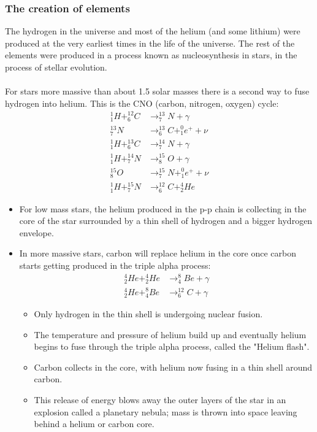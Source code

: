 \documentclass[a4paper,12pt]{article}
\begin{document}
\subsubsection*{The creation of elements}
The hydrogen in the universe and most of the helium (and some lithium) were produced at the very earliest times in the life of the universe. The rest of the elements were produced in a process known as nucleosynthesis in stars, in the process of stellar evolution.\\\\
For stars more massive than about 1.5 solar masses there is a second way to fuse hydrogen into helium. This is the CNO (carbon, nitrogen, oxygen) cycle:
\[\begin{aligned}
^1_1H+^{12}_6C&\rightarrow ^{13}_7N+\gamma\\
^{13}_7N&\rightarrow ^{13}_6C+^0_1e^++\nu\\
^1_1H+^{13}_6C&\rightarrow ^{14}_7N+\gamma\\
^1_1H+^{14}_7N&\rightarrow ^{15}_8O+\gamma\\
^{15}_8O&\rightarrow ^{15}_7N+^0_1e^++\nu\\
^1_1H+^{15}_7N&\rightarrow ^{12}_6C+^4_2He
\end{aligned}\]
\begin{itemize}
  \item For low mass stars, the helium produced in the p-p chain is collecting in the core of the star surrounded by a thin shell of hydrogen and a bigger hydrogen envelope.
  \item In more massive stars, carbon will replace helium in the core once carbon starts getting produced in the triple alpha process:
  \[
  \begin{aligned}
  ^4_2He+^4_2He&\rightarrow ^8_4Be + \gamma \\
  ^4_2He+^8_4Be&\rightarrow ^{12}_6C + \gamma
  \end{aligned}
  \]
  \begin{itemize}
    \item Only hydrogen in the thin shell is undergoing nuclear fusion. 
    \item The temperature and pressure of helium build up and eventually helium begins to fuse through the triple alpha process, called the "Helium flash".
    \item Carbon collects in the core, with helium now fusing in a thin shell around carbon.
    \item This release of energy blows away the outer layers of the star in an explosion called a planetary nebula; mass is thrown into space leaving behind a helium or carbon core.
  \end{itemize}
\end{itemize}
\end{document}
